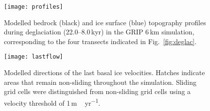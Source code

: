 \documentclass[tc, ms]{copernicus}
\begin{document}
\begin{figure}
  \texttt{[image: profiles]}
  \caption{Modelled bedrock (black) and ice surface (blue) topography profiles
           during deglaciation (22.0--8.0\,\unit{kyr}) in the GRIP 6\,\unit{km}
           simulation, corresponding to the four transects indicated in
           Fig.~\ref{fig:deglac}.}
  \label{fig:profiles}
\end{figure}

\begin{figure}
  \texttt{[image: lastflow]}
  \caption{Modelled directions of the last basal ice velocities. Hatches
           indicate areas that remain non-sliding throughout the simulation.
           Sliding grid cells were distinguished from non-sliding grid cells
           using a velocity threshold of 1\,\unit{m\,yr^{-1}}.}
  \label{fig:lastflow}
\end{figure}

\end{document}
